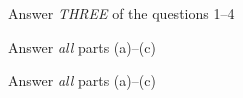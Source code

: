 \documentclass[a4paper,12pt,twoside]{article}
\begin{document}
\titlep





Answer \emph{THREE} of the questions 1--4
  
\questionsbegin  %



\item
  Answer \emph{all} parts (a)--(c) %
  \qitemsbegin %
  
  
  \qitemsend
  \clearpage  %


\item 
  Answer \emph{all} parts (a)--(c)
  


\clearpage



\end{document}
